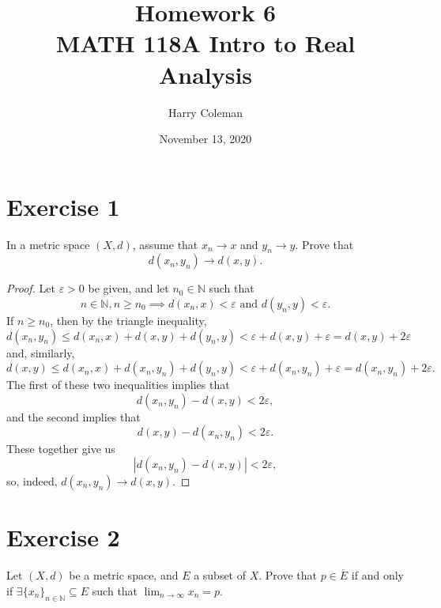 \documentclass[12pt]{article}
\newenvironment{problem}
    {\begin{lrbox}{\mybox}\begin{minipage}{0.98\textwidth}}
    {\end{minipage}\end{lrbox}\framebox[\textwidth]{\usebox{\mybox}}}
\let\eps\varepsilon %
\newcommand{\N}{\mathbb{N}} %
\newcommand{\<}{\left\langle} %
\renewcommand{\>}{\right\rangle} %
\begin{document}
 
\title{Homework 6\\
    \large MATH 118A Intro to Real Analysis
}
\author{Harry Coleman}
\date{November 13, 2020}
\maketitle

\section*{Exercise 1}
\begin{problem}
    In a metric space $(X,d)$, assume that $x_n\to x$ and $y_n \to y$. Prove that 
    \begin{equation}
        d(x_n,y_n) \to d(x,y).
    \end{equation}
\end{problem}

\begin{proof}
    Let $\eps>0$ be given, and let $n_0\in\N$ such that
    \[n\in\N, n\geq n_0 \implies d(x_n,x) < \eps \text{ and } d(y_n,y)<\eps.\]
    If $n\geq n_0$, then by the triangle inequality,
    \[d(x_n,y_n) \leq d(x_n,x) + d(x,y) + d(y_n,y) < \eps + d(x,y) + \eps = d(x,y) + 2\eps\]
    and, similarly,
    \[d(x,y) \leq d(x_n,x) + d(x_n,y_n) + d(y_n,y) < \eps + d(x_n,y_n) + \eps = d(x_n,y_n) + 2\eps.\]
    The first of these two inequalities implies that
    \[d(x_n,y_n) - d(x,y) < 2\eps,\]
    and the second implies that
    \[d(x,y) - d(x_n,y_n) < 2\eps.\]
    These together give us
    \[|d(x_n,y_n) - d(x,y)| < 2\eps,\]
    so, indeed, $d(x_n,y_n) \to d(x,y)$.

\end{proof}

\newpage
\section*{Exercise 2}
\begin{problem}
    Let $(X,d)$ be a metric space, and $E$ a subset of $X$. Prove that $p\in \overline{E}$ if and only if $\exists \{x_n\}_{n\in \mathbb{N}}\subseteq E$ such that $\lim _{n\to \infty} x_n = p$.
\end{problem}
\end{document}

